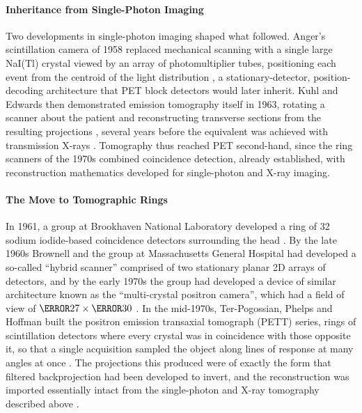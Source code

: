 \paragraph{Inheritance from Single-Photon Imaging}
Two developments in single-photon imaging shaped what followed.
Anger's scintillation camera of 1958 replaced mechanical scanning with a single large NaI(Tl) crystal viewed by an array of photomultiplier tubes, positioning each event from the centroid of the light distribution \cite{Anger1958}, a stationary-detector, position-decoding architecture that PET block detectors would later inherit.
Kuhl and Edwards then demonstrated emission tomography itself in 1963, rotating a scanner about the patient and reconstructing transverse sections from the resulting projections \cite{Kuhl1963}, several years before the equivalent was achieved with transmission X-rays \cite{Hounsfield1973}.
Tomography thus reached PET second-hand, since the ring scanners of the 1970s combined coincidence detection, already established, with reconstruction mathematics developed for single-photon and X-ray imaging.

\paragraph{The Move to Tomographic Rings}
In 1961, a group at Brookhaven National Laboratory developed a ring of 32 sodium iodide-based coincidence detectors surrounding the head \cite{Rankowitz1961}.
By the late 1960s Brownell and the group at Massachusetts General Hospital had developed a so-called ``hybrid scanner'' comprised of two stationary planar 2D arrays of detectors, and by the early 1970s the group had developed a device of similar architecture known as the ``multi-crystal positron camera'', which had a field of view of $\cm{27}\times\cm{30}$ \cite{Burnham1972}.
In the mid-1970s, Ter-Pogossian, Phelps and Hoffman built the positron emission transaxial tomograph (PETT) series, rings of scintillation detectors where every crystal was in coincidence with those opposite it, so that a single acquisition sampled the object along lines of response at many angles at once \cite{Ter-Pogossian1975}.
The projections this produced were of exactly the form that filtered backprojection had been developed to invert, and the reconstruction was imported essentially intact from the single-photon and X-ray tomography described above \cite{Phelps1975}.


